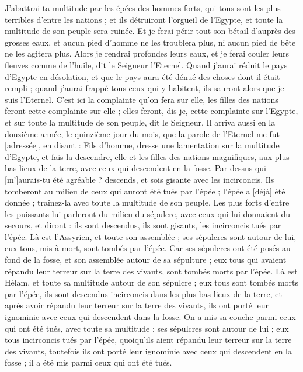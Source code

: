 \begin{multicols}{2}
J'abattrai ta multitude par les épées des hommes forts, qui tous sont les plus terribles d'entre les nations ; et ils détruiront l'orgueil de l'Egypte, et toute la multitude de son peuple sera ruinée.
Et je ferai périr tout son bétail d'auprès des grosses eaux, et aucun pied d'homme ne les troublera plus, ni aucun pied de bête ne les agitera plus.
Alors je rendrai profondes leurs eaux, et je ferai couler leurs fleuves comme de l'huile, dit le Seigneur l'Eternel.
Quand j'aurai réduit le pays d'Egypte en désolation, et que le pays aura été dénué des choses dont il était rempli ; quand j'aurai frappé tous ceux qui y habitent, ils sauront alors que je suis l'Eternel.
C'est ici la complainte qu'on fera sur elle, les filles des nations feront cette complainte sur elle ; elles feront, dis-je, cette complainte sur l'Egypte, et sur toute la multitude de son peuple, dit le Seigneur.
Il arriva aussi en la douzième année, le quinzième jour du mois, que la parole de l'Eternel me fut [adressée], en disant :
Fils d'homme, dresse une lamentation sur la multitude d'Egypte, et fais-la descendre, elle et les filles des nations magnifiques, aux plus bas lieux de la terre, avec ceux qui descendent en la fosse.
Par dessus qui [m']aurais-tu été agréable ? descends, et sois gisante avec les incirconcis.
Ils tomberont au milieu de ceux qui auront été tués par l'épée ; l'épée a [déjà] été donnée ; traînez-la avec toute la multitude de son peuple.
Les plus forts d'entre les puissants lui parleront du milieu du sépulcre, avec ceux qui lui donnaient du secours, et diront : ils sont descendus, ils sont gisants, les incirconcis tués par l'épée.
Là est l'Assyrien, et toute son assemblée ; ses sépulcres sont autour de lui, eux tous, mis à mort, sont tombés par l'épée.
Car ses sépulcres ont été posés au fond de la fosse, et son assemblée autour de sa sépulture ; eux tous qui avaient répandu leur terreur sur la terre des vivants, sont tombés morts par l'épée.
Là est Hélam, et toute sa multitude autour de son sépulcre ; eux tous sont tombés morts par l'épée, ils sont descendus incirconcis dans les plus bas lieux de la terre, et après avoir répandu leur terreur sur la terre des vivants, ils ont porté leur ignominie avec ceux qui descendent dans la fosse.
On a mis sa couche parmi ceux qui ont été tués, avec toute sa multitude ; ses sépulcres sont autour de lui ; eux tous incirconcis tués par l'épée, quoiqu'ils aient répandu leur terreur sur la terre des vivants, toutefois ils ont porté leur ignominie avec ceux qui descendent en la fosse ; il a été mis parmi ceux qui ont été tués.

\end{multicols}

